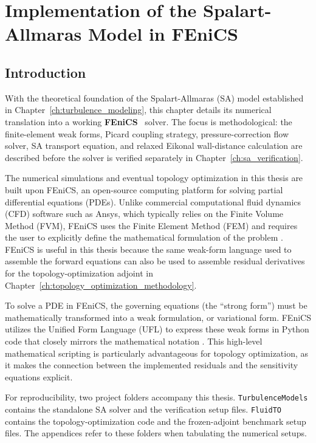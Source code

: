 \chapter{Implementation of the Spalart-Allmaras Model in FEniCS}
\label{ch:fenics_implementation}

\section{Introduction}
With the theoretical foundation of the Spalart-Allmaras (SA) model established in Chapter~\ref{ch:turbulence_modeling}, this chapter details its numerical translation into a working \textbf{FEniCS}~\cite{fenics_website} solver. The focus is methodological: the finite-element weak forms, Picard coupling strategy, pressure-correction flow solver, SA transport equation, and relaxed Eikonal wall-distance calculation are described before the solver is verified separately in Chapter~\ref{ch:sa_verification}.

The numerical simulations and eventual topology optimization in this thesis are built upon FEniCS, an open-source computing platform for solving partial differential equations (PDEs). Unlike commercial computational fluid dynamics (CFD) software such as Ansys, which typically relies on the Finite Volume Method (FVM), FEniCS uses the Finite Element Method (FEM) and requires the user to explicitly define the mathematical formulation of the problem \cite{Logg2012}. FEniCS is useful in this thesis because the same weak-form language used to assemble the forward equations can also be used to assemble residual derivatives for the topology-optimization adjoint in Chapter~\ref{ch:topology_optimization_methodology}.

To solve a PDE in FEniCS, the governing equations (the ``strong form'') must be mathematically transformed into a weak formulation, or variational form. FEniCS utilizes the Unified Form Language (UFL) to express these weak forms in Python code that closely mirrors the mathematical notation \cite{Langtangen2016}. This high-level mathematical scripting is particularly advantageous for topology optimization, as it makes the connection between the implemented residuals and the sensitivity equations explicit.

For reproducibility, two project folders accompany this thesis. \texttt{Turbulence\allowbreak Models} contains the standalone SA solver and the verification setup files. \texttt{FluidTO} contains the topology-optimization code and the frozen-adjoint benchmark setup files. The appendices refer to these folders when tabulating the numerical setups.

